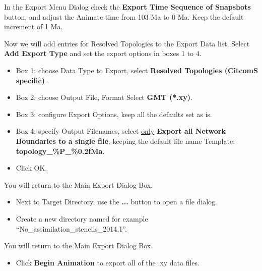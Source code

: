 \documentclass[letterpaper,12pt]{article}
\newcommand{\gp}[1]{\textbf{#1}}
\begin{document}
In the Export Menu Dialog check the \gp{Export Time Sequence of Snapshots} button, 
and adjust the Animate time from 103 Ma to 0 Ma.  Keep the default increment of 1 Ma.

Now we will add entries for Resolved Topologies to the Export Data list.
Select \gp{Add Export Type} and set the export options in boxes 1 to 4.

\begin{itemize}
\item Box 1: choose Data Type to Export, select \gp{Resolved Topologies (CitcomS specific) }.
\item Box 2: choose Output File, Format Select \gp{GMT (*.xy)}.
\item Box 3: configure Export Options, keep all the defaults set as is.
\item Box 4: specify Output Filenames, select \underline{only} \gp{Export all Network Boundaries to a single file}, keeping the default file name Template: \gp{topology\_\%P\_\%0.2fMa}.
\item Click OK.
\end{itemize}

You will return to the Main Export Dialog Box.

\begin{itemize}
\item Next to Target Directory, use the \gp{...} button to open a file dialog.
\item Create a new directory named for example ``No\_assimilation\_stencils\_2014.1''.
\end{itemize}

You will return to the Main Export Dialog Box.

\begin{itemize}
\item Click \gp{Begin Animation} to export all of the .xy data files.
\end{itemize}
\end{document}
